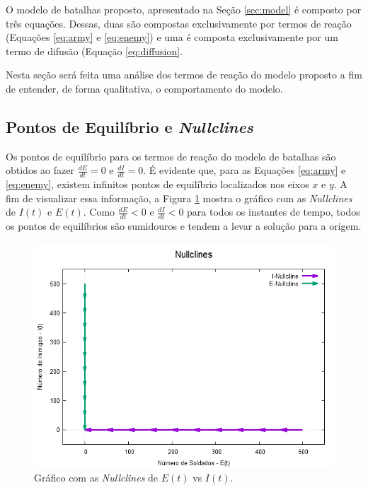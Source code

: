 \documentclass{article}
\begin{document}
O modelo de batalhas proposto, apresentado na Seção \ref{sec:model} é composto por três equações. Dessas, duas são compostas exclusivamente por termos de reação (Equações \ref{eq:army} e \ref{eq:enemy}) e uma é composta exclusivamente por um termo de difusão (Equação \ref{eq:diffusion}.

Nesta seção será feita uma análise dos termos de reação do modelo proposto a fim de entender, de forma qualitativa, o comportamento do modelo.

\subsection{Pontos de Equilíbrio e \textit{Nullclines}}

Os pontos de equilíbrio para os termos de reação do modelo de batalhas são obtidos ao fazer $\frac{dE}{dt} = 0$ e $\frac{dI}{dt} = 0$. É evidente que, para as Equações \ref{eq:army} e \ref{eq:enemy}, existem infinitos pontos de equilíbrio localizados nos eixos $x$ e $y$. A fim de visualizar essa informação, a Figura \ref{fig:nullclines} mostra o gráfico com as \textit{Nullclines} de $I(t)$ e $E(t)$. Como $\frac{dE}{dt} < 0$ e $\frac{dI}{dt} < 0$ para todos os instantes de tempo, todos os pontos de equilíbrios são sumidouros e tendem a levar a solução para a origem.

\begin{figure}[ht]
	\centering
	\includegraphics[scale=0.4]{figs/nullclines.png}
	\caption{Gráfico com as \textit{Nullclines} de $E(t)$ vs $I(t)$.}
	\label{fig:nullclines}
\end{figure}
\end{document}
